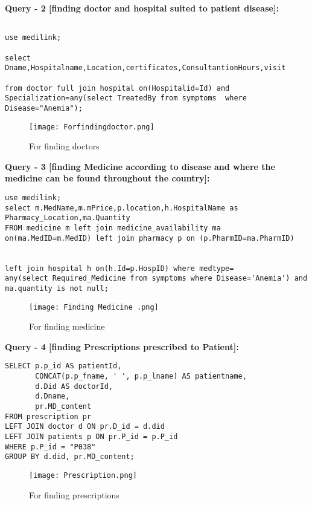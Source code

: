 \documentclass[11pt]{article}
\begin{document}
\textbf{Query - 2 [finding doctor and hospital suited to patient disease]:}

\begin{lstlisting}

use medilink;

select Dname,Hospitalname,Location,certificates,ConsultantionHours,visit 

from doctor full join hospital on(Hospitalid=Id) and Specialization=any(select TreatedBy from symptoms  where Disease="Anemia");
\end{lstlisting}

\begin{figure}[H]
    \centering
    \texttt{[image: Forfindingdoctor.png]}
    \caption{For finding doctors}
    \label{fig:1}
\end{figure}

\textbf{Query - 3 [finding Medicine according to disease and where the medicine can be found throughout the country]:}

\begin{lstlisting}
use medilink; 
select m.MedName,m.mPrice,p.location,h.HospitalName as Pharmacy_Location,ma.Quantity 
FROM medicine m left join medicine_availability ma 
on(ma.MedID=m.MedID) left join pharmacy p on (p.PharmID=ma.PharmID) 


left join hospital h on(h.Id=p.HospID) where medtype=
any(select Required_Medicine from symptoms where Disease='Anemia') and ma.quantity is not null;
\end{lstlisting}

\begin{figure}[H]
    \centering
    \texttt{[image: Finding Medicine .png]}
    \caption{For finding medicine}
    \label{fig:1}
\end{figure}


\textbf{Query - 4 [finding Prescriptions prescribed to Patient]:}

\begin{lstlisting}
SELECT p.p_id AS patientId,
       CONCAT(p.p_fname, ' ', p.p_lname) AS patientname,
       d.Did AS doctorId,
       d.Dname,
       pr.MD_content
FROM prescription pr
LEFT JOIN doctor d ON pr.D_id = d.did
LEFT JOIN patients p ON pr.P_id = p.P_id
WHERE p.P_id = "P038"
GROUP BY d.did, pr.MD_content;

\end{lstlisting}

\begin{figure}[H]
    \centering
    \texttt{[image: Prescription.png]}
    \caption{For finding prescriptions}
    \label{fig:1}
\end{figure}
\end{document}
